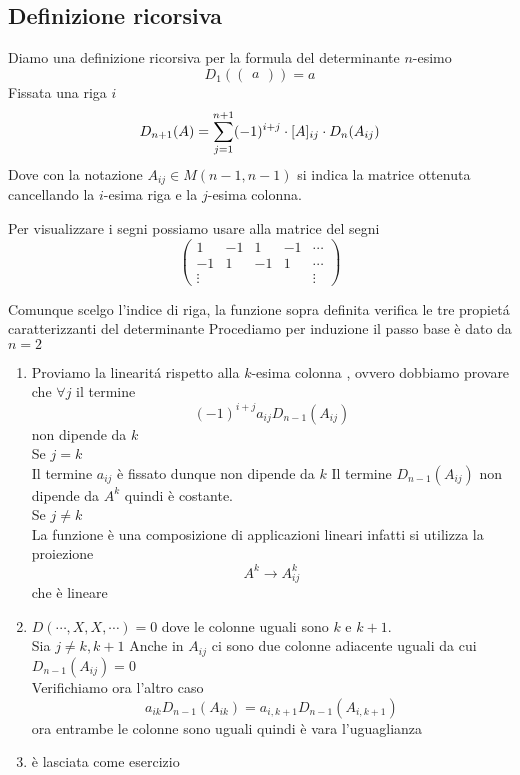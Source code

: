 \subsection{Definizione ricorsiva}
\begin{defn}\bianco
Diamo una definizione ricorsiva per la formula del determinante $n$-esimo
$$D_1 \left(\begin{pmatrix}
a
\end{pmatrix}\right) =a $$
Fissata una riga $i$ 
$$ D_{n+1}(A)= \sum_{j=1} ^{n+1}  (-1) ^ {i+j} \cdot [A]_{ij}\cdot D_{n} ( A_{ij} ) $$
Dove con la notazione $ A_{ij} \in M(n-1,n-1) $ si indica la matrice ottenuta cancellando la $i$-esima riga e la $j$-esima colonna.
\end{defn}
Per visualizzare i segni possiamo usare alla matrice del segni
$$\begin{pmatrix}
1& -1 & 1 & -1 &\cdots \\
-1& 1 & -1 & 1 &\cdots \\
\vdots &   &   & &  \vdots
\end{pmatrix}$$
\spazio
\begin{prop} Comunque scelgo l'indice di riga, la funzione sopra definita  verifica le tre propiet\'a caratterizzanti del determinante
\proof Procediamo per induzione il passo base \`e dato da $n=2$
\begin{enumerate} 
\item Proviamo la linearit\'a rispetto alla $k$-esima colonna , ovvero dobbiamo provare che $\forall j $ il termine 
$$ (-1)^{i+j} a_{ij}D_{n-1}(A_{ij})$$
non dipende da $k$\\
Se $j=k$\\
Il termine $a_{ij}$ \`e fissato dunque non dipende da $k$
Il termine $D_{n-1}(A_{ij}) $ non dipende da $A^k$ quindi \`e costante.\\
Se $j \neq k $\\
La funzione \`e una composizione di applicazioni lineari infatti si utilizza la proiezione $$ A^k \to A^k_{ij} $$
che \`e lineare
\item $ D( \cdots , X, X , \cdots) =0$ dove le colonne uguali sono $k$ e $k+1$.\\
Sia $j\neq k, k+1 $
Anche in $A_{ij}$ ci sono due colonne adiacente uguali da cui $D_{n-1} (A_{ij})=0$\\
Verifichiamo ora l'altro caso 
$$ a_{ik}D_{n-1}(A_{ik})=a_{i,k+1} D_{n-1}(A_{i,k+1} ) $$ 
ora entrambe le colonne sono uguali quindi \`e vara l'uguaglianza
\item \`e lasciata come esercizio
\end{enumerate}
\endproof
\end{prop}





% 